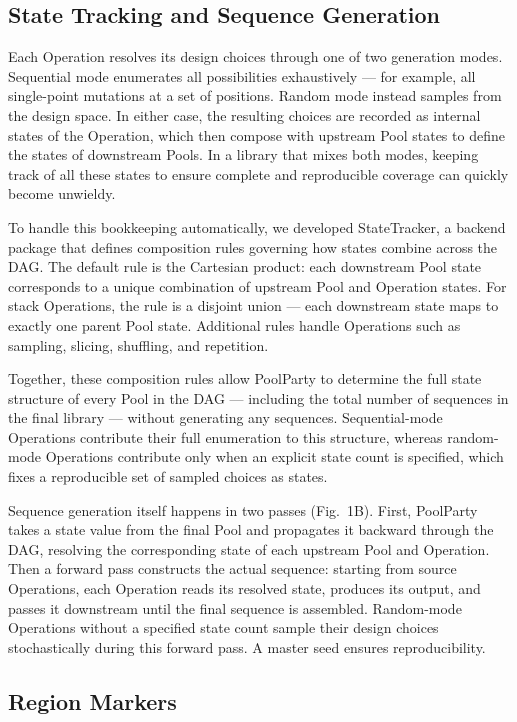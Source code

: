 \documentclass[unnumsec,webpdf,modern,large]{mam-authoring-template}%
\theoremstyle{thmstyleone}%
\theoremstyle{thmstyletwo}%
\theoremstyle{thmstylethree}%
\begin{document}
\subsection{State Tracking and Sequence Generation}

Each Operation resolves its design choices through one of two generation modes. Sequential mode enumerates all possibilities exhaustively --- for example, all single-point mutations at a set of positions. Random mode instead samples from the design space. In either case, the resulting choices are recorded as internal states of the Operation, which then compose with upstream Pool states to define the states of downstream Pools. In a library that mixes both modes, keeping track of all these states to ensure complete and reproducible coverage can quickly become unwieldy.

To handle this bookkeeping automatically, we developed StateTracker, a backend package that defines composition rules governing how states combine across the DAG. The default rule is the Cartesian product: each downstream Pool state corresponds to a unique combination of upstream Pool and Operation states. For stack Operations, the rule is a disjoint union --- each downstream state maps to exactly one parent Pool state. Additional rules handle Operations such as sampling, slicing, shuffling, and repetition.

Together, these composition rules allow PoolParty to determine the full state structure of every Pool in the DAG --- including the total number of sequences in the final library --- without generating any sequences. Sequential-mode Operations contribute their full enumeration to this structure, whereas random-mode Operations contribute only when an explicit state count is specified, which fixes a reproducible set of sampled choices as states.

Sequence generation itself happens in two passes (Fig.~1B). First, PoolParty takes a state value from the final Pool and propagates it backward through the DAG, resolving the corresponding state of each upstream Pool and Operation. Then a forward pass constructs the actual sequence: starting from source Operations, each Operation reads its resolved state, produces its output, and passes it downstream until the final sequence is assembled. Random-mode Operations without a specified state count sample their design choices stochastically during this forward pass. A master seed ensures reproducibility.

\subsection{Region Markers}
\end{document}
